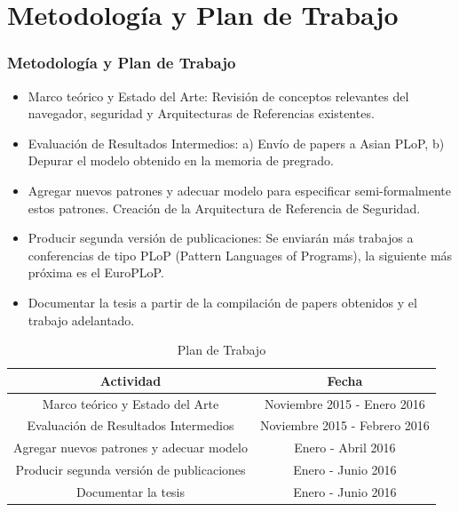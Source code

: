 \documentclass[serif,9pt]{beamer}
\begin{document}
\section{Metodología y Plan de Trabajo}
\begin{frame}
	\frametitle{Metodología y Plan de Trabajo}
	\begin{itemize}
		\item Marco teórico y Estado del Arte: Revisión de conceptos relevantes del navegador, seguridad y Arquitecturas de Referencias existentes.
		\item Evaluación de Resultados Intermedios: a) Envío de papers a Asian PLoP, b) Depurar el modelo obtenido en la memoria de pregrado.
		\item Agregar nuevos patrones y adecuar modelo para especificar semi-formalmente estos patrones. Creación de la Arquitectura de Referencia de Seguridad.
		\item Producir segunda versión de publicaciones: Se enviarán más trabajos a conferencias de tipo PLoP (Pattern Languages of Programs), la siguiente más próxima es el EuroPLoP.
		\item Documentar la tesis a partir de la compilación de papers obtenidos y el trabajo adelantado.
	\end{itemize}

	\begin{table}
        \begin{tabular}{|c|c|} 
        \hline        
        \textbf{Actividad} & \textbf{Fecha}\\
        \hline
        Marco teórico y Estado del Arte & Noviembre 2015 - Enero 2016\\
        \hline
        Evaluación de Resultados Intermedios & Noviembre 2015  - Febrero 2016\\
        \hline
        Agregar nuevos patrones y adecuar modelo & Enero - Abril 2016\\
        \hline
        Producir segunda versión de publicaciones & Enero - Junio 2016\\
        \hline
        Documentar la tesis & Enero - Junio 2016\\        
        \hline
        \end{tabular}
        \caption{Plan de Trabajo}
        \label{tab:trabajo}
    \end{table}
\end{frame}
\end{document}
